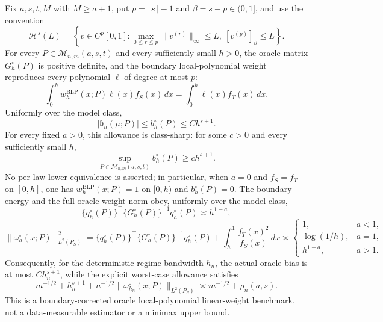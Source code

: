 Fix \(a,s,t,M\) with \(M\ge a+1\), put \(p=\lceil s\rceil-1\) and \(\beta=s-p\in(0,1]\), and use the convention
\[
\mathcal H^s(L)=\left\{v\in C^p[0,1]:
\max_{0\le r\le p}\|v^{(r)}\|_\infty\le L,
\ [v^{(p)}]_{\beta}\le L\right\}.
\]
For every \(P\in\mathcal M_{n,m}(a,s,t)\) and every sufficiently small \(h>0\), the oracle matrix \(G_h^{\circ}(P)\) is positive definite, and the boundary local-polynomial weight reproduces every polynomial \(\ell\) of degree at most \(p\):
\[
\int_0^h w_h^{\mathrm{BLP}}(x;P)\ell(x)f_S(x)\,dx
=\int_0^h\ell(x)f_T(x)\,dx.
\]
Uniformly over the model class,
\[
|\mathfrak b_h(\mu;P)|\le b_h^{\circ}(P)\le C h^{s+1}.
\]
For every fixed \(a>0\), this allowance is class-sharp: for some \(c>0\) and every sufficiently small \(h\),
\[
\sup_{P\in\mathcal M_{n,m}(a,s,t)}b_h^{\circ}(P)\ge c h^{s+1}.
\]
No per-law lower equivalence is asserted; in particular, when \(a=0\) and \(f_S=f_T\) on \([0,h]\), one has \(w_h^{\mathrm{BLP}}(x;P)=1\) on \([0,h)\) and \(b_h^{\circ}(P)=0\). The boundary energy and the full oracle-weight norm obey, uniformly over the model class,
\[
\{q_h^{\circ}(P)\}^\top\{G_h^{\circ}(P)\}^{-1}q_h^{\circ}(P)\asymp h^{1-a},
\]
\[
\|\omega_h^{\circ}(x;P)\|_{L^2(P_S)}^2
=\{q_h^{\circ}(P)\}^\top\{G_h^{\circ}(P)\}^{-1}q_h^{\circ}(P)
+\int_h^1\frac{f_T(x)^2}{f_S(x)}\,dx
\asymp
\begin{cases}
1,&a<1,\\
\log(1/h),&a=1,\\
h^{1-a},&a>1.
\end{cases}
\]
Consequently, for the deterministic regime bandwidth \(h_n\), the actual oracle bias is at most \(C h_n^{s+1}\), while the explicit worst-case allowance satisfies
\[
m^{-1/2}+h_n^{s+1}
+n^{-1/2}\|\omega_{h_n}^{\circ}(x;P)\|_{L^2(P_S)}
\asymp m^{-1/2}+\rho_n(a,s).
\]
This is a boundary-corrected oracle local-polynomial linear-weight benchmark, not a data-measurable estimator or a minimax upper bound.